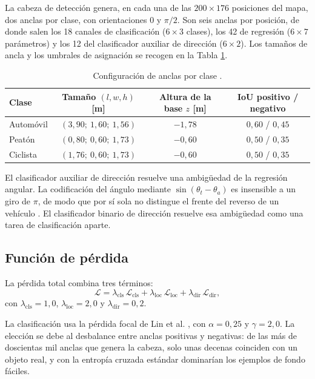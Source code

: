 \documentclass[11pt,letterpaper]{article}
\begin{document}
La cabeza de detección genera, en cada una de las $200 \times 176$ posiciones del mapa, dos anclas por clase, con orientaciones $0$ y $\pi/2$. Son seis anclas por posición, de donde salen los 18 canales de clasificación ($6 \times 3$ clases), los 42 de regresión ($6 \times 7$ parámetros) y los 12 del clasificador auxiliar de dirección ($6 \times 2$). Los tamaños de ancla y los umbrales de asignación se recogen en la Tabla \ref{tab:anclas}.

\begin{table}[htbp]
\caption{Configuración de anclas por clase \cite{openpcdet}.}
\label{tab:anclas}
\centering
\small
\begin{tabular}{@{}lccc@{}}
\toprule
\textbf{Clase} & \textbf{Tamaño $(l, w, h)$ [m]} & \textbf{Altura de la base $z$ [m]} & \textbf{IoU positivo / negativo} \\
\midrule
Automóvil & $(3{,}90;\ 1{,}60;\ 1{,}56)$ & $-1{,}78$ & $0{,}60$ / $0{,}45$ \\
Peatón & $(0{,}80;\ 0{,}60;\ 1{,}73)$ & $-0{,}60$ & $0{,}50$ / $0{,}35$ \\
Ciclista & $(1{,}76;\ 0{,}60;\ 1{,}73)$ & $-0{,}60$ & $0{,}50$ / $0{,}35$ \\
\bottomrule
\end{tabular}
\end{table}

El clasificador auxiliar de dirección resuelve una ambigüedad de la regresión angular. La codificación del ángulo mediante $\sin(\theta_t - \theta_a)$ es insensible a un giro de $\pi$, de modo que por sí sola no distingue el frente del reverso de un vehículo \cite{yan2018}. El clasificador binario de dirección resuelve esa ambigüedad como una tarea de clasificación aparte.

\subsection{Función de pérdida}

La pérdida total combina tres términos:
\begin{equation}
\mathcal{L} = \lambda_{\text{cls}}\, \mathcal{L}_{\text{cls}} + \lambda_{\text{loc}}\, \mathcal{L}_{\text{loc}} + \lambda_{\text{dir}}\, \mathcal{L}_{\text{dir}},
\end{equation}
con $\lambda_{\text{cls}} = 1{,}0$, $\lambda_{\text{loc}} = 2{,}0$ y $\lambda_{\text{dir}} = 0{,}2$.

La clasificación usa la pérdida focal de Lin et al. \cite{lin2017}, con $\alpha = 0{,}25$ y $\gamma = 2{,}0$. La elección se debe al desbalance entre anclas positivas y negativas: de las más de doscientas mil anclas que genera la cabeza, solo unas decenas coinciden con un objeto real, y con la entropía cruzada estándar dominarían los ejemplos de fondo fáciles.
\end{document}
